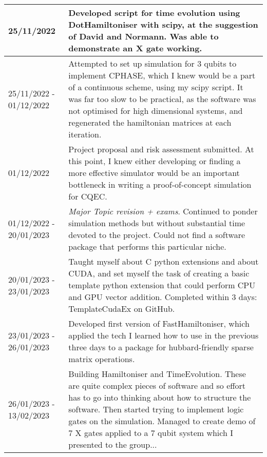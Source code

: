\documentclass{article}
\begin{document}
\begin{table}
\begin{tabular}{|p{2cm}|p{10cm}|}
    \hline 25/11/2022& Developed script for time evolution using DotHamiltoniser with scipy, at the suggestion of David and Normann. Was able to demonstrate an X gate working.\\
    \hline 25/11/2022 - 01/12/2022 & Attempted to set up simulation for 3 qubits to implement CPHASE, which I knew would be a part of a continuous scheme, using my scipy script. It was far too slow to be practical, as the software was not optimised for high dimensional systems, and regenerated the hamiltonian matrices at each iteration.\\
    \hline 01/12/2022 & Project proposal and risk assessment submitted. At this point, I knew either developing or finding a more effective simulator would be an important bottleneck in writing a proof-of-concept simulation for CQEC.\\
    \hline 01/12/2022 - 20/01/2023& \textit{Major Topic revision + exams}. Continued to ponder simulation methods but without substantial time devoted to the project. Could not find a software package that performs this particular niche.\\
    \hline 20/01/2023 - 23/01/2023& Taught myself about C python extensions and about CUDA, and set myself the task of creating a basic template python extension that could perform CPU and GPU vector addition. Completed within 3 days: TemplateCudaEx on GitHub.\\
    \hline 23/01/2023 - 26/01/2023& Developed first version of FastHamiltoniser, which applied the tech I learned how to use in the previous three days to a package for hubbard-friendly sparse matrix operations.\\
    \hline 26/01/2023 - 13/02/2023& Building Hamiltoniser and TimeEvolution. These are quite complex pieces of software and so effort has to go into thinking about how to structure the software. Then started trying to implement logic gates on the simulation. Managed to create demo of 7 X gates applied to a 7 qubit system which I presented to the group... \\
    \hline
\end{tabular}
\end{table}
\end{document}

